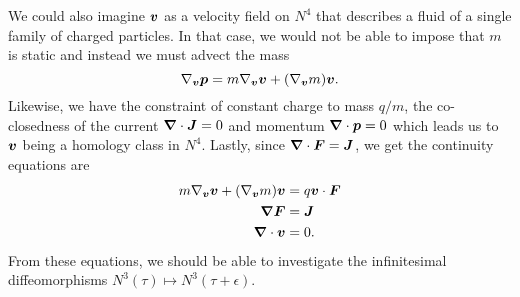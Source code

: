 \documentclass{article}
\begin{document}
We could also imagine ${\boldsymbol{v}}$ as a velocity field on $N^4$ that describes a fluid of a single family of charged particles. In that case, we would not be able to impose that $m$ is static and instead we must advect the mass
\begin{equation}
   \nabla_{\boldsymbol{v}} \boldsymbol{p} = m \nabla_{\boldsymbol{v}} \boldsymbol{v} + (\nabla_{\boldsymbol{v}} m)\boldsymbol{v}.
\end{equation}
Likewise, we have the constraint of constant charge to mass $q/m$, the co-closedness of the current $\boldsymbol{\nabla} \cdot \boldsymbol{J}=0$ and momentum $\boldsymbol{\nabla} \cdot \boldsymbol{p}=0$ which leads us to $\boldsymbol{v}$ being a homology class in $N^4$. Lastly, since $\boldsymbol{\nabla} \cdot \boldsymbol{F} = \boldsymbol{J}$, we get the continuity equations are
\begin{align}
    m \nabla_{\boldsymbol{v}} \boldsymbol{v} + (\nabla_{\boldsymbol{v}} m)\boldsymbol{v} &= q \boldsymbol{v} \cdot \boldsymbol{F}\\
    \boldsymbol{\nabla} \boldsymbol{F} &= \boldsymbol{J}\\
    \boldsymbol{\nabla} \cdot \boldsymbol{v} &= 0.
\end{align}
From these equations, we should be able to investigate the infinitesimal diffeomorphisms $N^3(\tau)\mapsto N^3(\tau+\epsilon)$.







\end{document}
